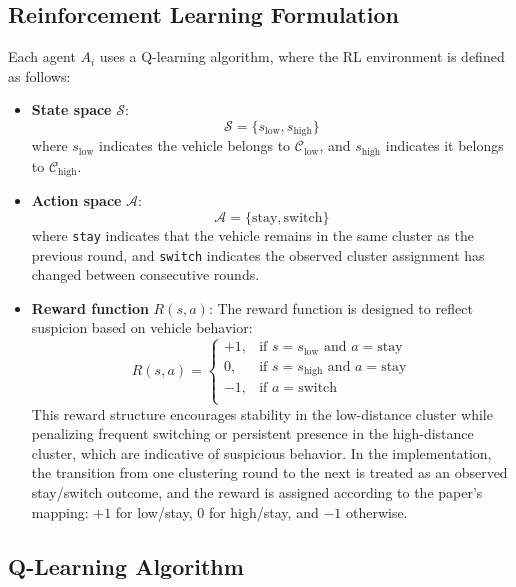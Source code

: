 \documentclass[conference]{IEEEtran}
\begin{document}
\subsection{Reinforcement Learning Formulation}

Each agent $A_i$ uses a Q-learning algorithm, where the RL environment is defined as follows:

\begin{itemize}
    \item \textbf{State space} $\mathcal{S}$: 
    \[
    \mathcal{S} = \{s_{\text{low}}, s_{\text{high}}\}
    \]
    where $s_{\text{low}}$ indicates the vehicle belongs to $\mathcal{C}_{\text{low}}$, and $s_{\text{high}}$ indicates it belongs to $\mathcal{C}_{\text{high}}$.

    \item \textbf{Action space} $\mathcal{A}$:
    \[
    \mathcal{A} = \{\text{stay}, \text{switch}\}
    \]
    where \texttt{stay} indicates that the vehicle remains in the same cluster as the previous round, and \texttt{switch} indicates the observed cluster assignment has changed between consecutive rounds.

    \item \textbf{Reward function} $R(s,a)$:
    The reward function is designed to reflect suspicion based on vehicle behavior:
    \[
    R(s, a) = 
    \begin{cases}
        +1, & \text{if } s = s_{\text{low}} \text{ and } a = \text{stay} \\
        0,  & \text{if } s = s_{\text{high}} \text{ and } a = \text{stay} \\
        -1, & \text{if } a = \text{switch} \\
    \end{cases}
    \]
    This reward structure encourages stability in the low-distance cluster while penalizing frequent switching or persistent presence in the high-distance cluster, which are indicative of suspicious behavior. In the implementation, the transition from one clustering round to the next is treated as an observed stay/switch outcome, and the reward is assigned according to the paper's mapping: $+1$ for low/stay, $0$ for high/stay, and $-1$ otherwise.
\end{itemize}

\subsection{Q-Learning Algorithm}
\end{document}
